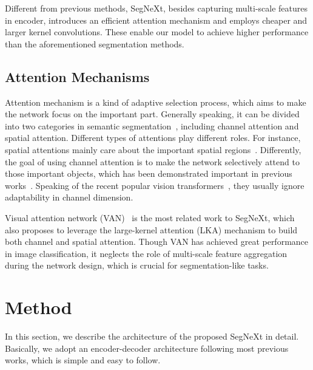 \documentclass{article}
\def\modelname{SegNeXt}
\begin{document}
Different from previous methods, \modelname, besides capturing multi-scale
features in encoder, introduces an efficient attention mechanism and employs
cheaper and larger kernel convolutions.
These enable our model to achieve higher performance than the aforementioned segmentation
methods.



\subsection{Attention Mechanisms}

Attention mechanism is a kind of adaptive selection process,
which aims to make the network focus on the important part.
Generally speaking, it can be divided into two categories in semantic 
segmentation~\cite{guo2021attention_survey}, including channel attention and spatial attention. 
Different types of attentions play different roles.
For instance, spatial attentions mainly care about the important spatial regions~\cite{dosovitskiy2020image,dai2017deformable,mnih2014recurrent,liu2021swin,guo_pct}.
Differently, the goal of using channel attention is to make the network selectively attend to those important objects, which has been demonstrated important in previous works~\cite{hu2018squeeze,chen2017sca,wang2020ecanet}.
Speaking of the recent popular vision transformers~\cite{dosovitskiy2020image,liu2021swin,yang2021focal,wang2021pyramid,wang2021pvtv2,liu2021fuseformer,xie2021segformer,huang2022flowformer,liu2021decoupled,yuan2021hrformer}, they usually ignore adaptability in channel dimension. 



Visual attention network (VAN)~\cite{guo2022visual} is the most related work to SegNeXt, 
which also proposes to leverage the large-kernel attention (LKA) mechanism to build both channel and spatial attention.
Though VAN has achieved great performance in image classification,
it neglects the role of multi-scale feature aggregation during the network design, which
is crucial for segmentation-like tasks.




\section{Method}




In this section, we describe the architecture of the proposed SegNeXt in detail.
Basically, we adopt an encoder-decoder architecture following most previous works,
which is simple and easy to follow.
\end{document}
